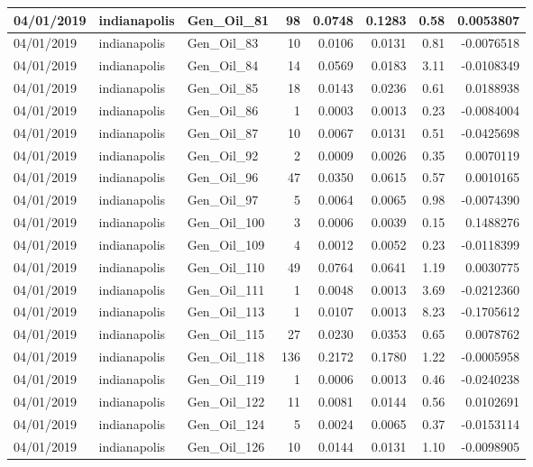 \documentclass[
  letterpaper,
  DIV=11,
  numbers=noendperiod]{scrartcl}
\begin{document}
\begin{tabular}{l|l|l|r|r|r|r|r}
\hline
04/01/2019 & indianapolis & Gen\_Oil\_81 & 98 & 0.0748 & 0.1283 & 0.58 & 0.0053807\\
\hline
04/01/2019 & indianapolis & Gen\_Oil\_83 & 10 & 0.0106 & 0.0131 & 0.81 & -0.0076518\\
\hline
04/01/2019 & indianapolis & Gen\_Oil\_84 & 14 & 0.0569 & 0.0183 & 3.11 & -0.0108349\\
\hline
04/01/2019 & indianapolis & Gen\_Oil\_85 & 18 & 0.0143 & 0.0236 & 0.61 & 0.0188938\\
\hline
04/01/2019 & indianapolis & Gen\_Oil\_86 & 1 & 0.0003 & 0.0013 & 0.23 & -0.0084004\\
\hline
04/01/2019 & indianapolis & Gen\_Oil\_87 & 10 & 0.0067 & 0.0131 & 0.51 & -0.0425698\\
\hline
04/01/2019 & indianapolis & Gen\_Oil\_92 & 2 & 0.0009 & 0.0026 & 0.35 & 0.0070119\\
\hline
04/01/2019 & indianapolis & Gen\_Oil\_96 & 47 & 0.0350 & 0.0615 & 0.57 & 0.0010165\\
\hline
04/01/2019 & indianapolis & Gen\_Oil\_97 & 5 & 0.0064 & 0.0065 & 0.98 & -0.0074390\\
\hline
04/01/2019 & indianapolis & Gen\_Oil\_100 & 3 & 0.0006 & 0.0039 & 0.15 & 0.1488276\\
\hline
04/01/2019 & indianapolis & Gen\_Oil\_109 & 4 & 0.0012 & 0.0052 & 0.23 & -0.0118399\\
\hline
04/01/2019 & indianapolis & Gen\_Oil\_110 & 49 & 0.0764 & 0.0641 & 1.19 & 0.0030775\\
\hline
04/01/2019 & indianapolis & Gen\_Oil\_111 & 1 & 0.0048 & 0.0013 & 3.69 & -0.0212360\\
\hline
04/01/2019 & indianapolis & Gen\_Oil\_113 & 1 & 0.0107 & 0.0013 & 8.23 & -0.1705612\\
\hline
04/01/2019 & indianapolis & Gen\_Oil\_115 & 27 & 0.0230 & 0.0353 & 0.65 & 0.0078762\\
\hline
04/01/2019 & indianapolis & Gen\_Oil\_118 & 136 & 0.2172 & 0.1780 & 1.22 & -0.0005958\\
\hline
04/01/2019 & indianapolis & Gen\_Oil\_119 & 1 & 0.0006 & 0.0013 & 0.46 & -0.0240238\\
\hline
04/01/2019 & indianapolis & Gen\_Oil\_122 & 11 & 0.0081 & 0.0144 & 0.56 & 0.0102691\\
\hline
04/01/2019 & indianapolis & Gen\_Oil\_124 & 5 & 0.0024 & 0.0065 & 0.37 & -0.0153114\\
\hline
04/01/2019 & indianapolis & Gen\_Oil\_126 & 10 & 0.0144 & 0.0131 & 1.10 & -0.0098905\\

\end{tabular}
\end{document}
